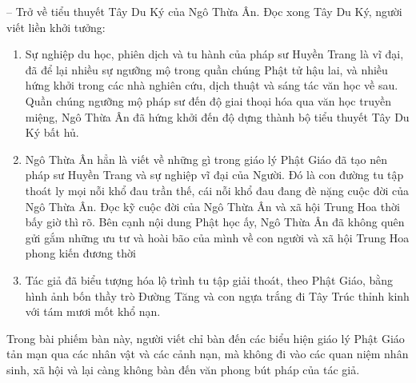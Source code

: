 -- Trở về tiểu thuyết Tây Du Ký của Ngô Thừa Ân. Đọc xong Tây Du Ký, người viết liền khởi tưởng:

\begin{enumerate}[label=\itshape\alph*\upshape/]
   \item Sự nghiệp du học, phiên dịch và tu hành của pháp sư Huyền Trang là vĩ đại, đã để lại nhiều sự ngưỡng mộ trong quần chúng Phật tử hậu lai, và nhiều hứng khởi trong các nhà nghiên cứu, dịch thuật và sáng tác văn học về sau. Quần chúng ngưỡng mộ pháp sư đến độ giai thoại hóa qua văn học truyền miệng, Ngô Thừa Ân đã hứng khởi đến độ dựng thành bộ tiểu thuyết Tây Du Ký bất hủ.

   \item Ngô Thừa Ân hẳn là viết về những gì trong giáo lý Phật Giáo đã tạo nên pháp sư Huyền Trang và sự nghiệp vĩ đại của Người. Đó là con đường tu tập thoát ly mọi nỗi khổ đau trần thế, cái nỗi khổ đau đang đè nặng cuộc đời của Ngô Thừa Ân. Đọc kỹ cuộc đời của Ngô Thừa Ân và xã hội Trung Hoa thời bấy giờ thì rõ. Bên cạnh nội dung Phật học ấy, Ngô Thừa Ân đã không quên gửi gắm những ưu tư và hoài bão của mình về con người và xã hội Trung Hoa phong kiến đương thời

   \item Tác giả đã biểu tượng hóa lộ trình tu tập giải thoát, theo Phật Giáo, bằng hình ảnh bốn thầy trò Đường Tăng và con ngựa trắng đi Tây Trúc thỉnh kinh với tám mươi mốt khổ nạn.
\end{enumerate}

Trong bài phiếm bàn này, người viết chỉ bàn đến các biểu hiện giáo lý Phật Giáo tản mạn qua các nhân vật và các cảnh nạn, mà không đi vào các quan niệm nhân sinh, xã hội và lại càng không bàn đến văn phong bút pháp của tác giả.

